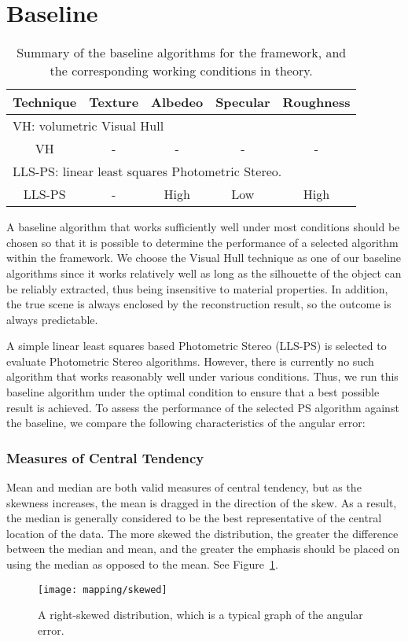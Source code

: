 \section{Baseline}
\begin{table}[!htbp]
\centering
\begin{tabular}{c|c|c|c|c}
\toprule
Technique & Texture & Albedeo & Specular & Roughness\\
\midrule
\multicolumn{5}{l}{VH: volumetric Visual Hull}\\
\midrule
VH & - & - & - & -\\
\midrule
\multicolumn{5}{l}{LLS-PS: linear least squares Photometric Stereo.}\\
\midrule
LLS-PS & - & High & Low & High\\
\bottomrule
\end{tabular}
\caption{Summary of the baseline algorithms for the framework, and the corresponding working conditions in theory.}
\label{tab:selected_baseline_algos}
\end{table}
A baseline algorithm that works sufficiently well under most conditions should be chosen so that it is possible to determine the performance of a selected algorithm within the framework. We choose the Visual Hull technique as one of our baseline algorithms since it works relatively well as long as the silhouette of the object can be reliably extracted, thus being insensitive to material properties. In addition, the true scene is always enclosed by the reconstruction result, so the outcome is always predictable.

A simple linear least squares based Photometric Stereo (LLS-PS) is selected to evaluate Photometric Stereo algorithms. However, there is currently no such algorithm that works reasonably well under various conditions. Thus, we run this baseline algorithm under the optimal condition to ensure that a best possible result is achieved. To assess the performance of the selected PS algorithm against the baseline, we compare the following characteristics of the angular error:

\subsubsection{Measures of Central Tendency}
Mean and median are both valid measures of central tendency, but as the skewness increases, the mean is dragged in the direction of the skew. As a result, the median is generally considered to be the best representative of the central location of the data. The more skewed the distribution, the greater the difference between the median and mean, and the greater the emphasis should be placed on using the median as opposed to the mean. See Figure~\ref{fig:ang_diff_skew}.
\begin{figure}[!htbp]
\centering
\texttt{[image: mapping/skewed]}
\caption{A right-skewed distribution, which is a typical graph of the angular error.}
\label{fig:ang_diff_skew}
\end{figure}

